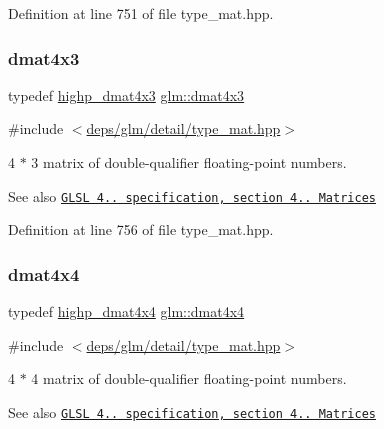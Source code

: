 Definition at line 751 of file type\+\_\+mat.\+hpp.

\mbox{\label{group__core__types_gaa4a157ac183c5bd5dcbd555a94b1b505}} 
\subsubsection{\texorpdfstring{dmat4x3}{dmat4x3}}
{\footnotesize\ttfamily typedef \hyperlink{group__core__precision_ga9a5dab260df6e8c46c747bac0b8d2f38}{highp\+\_\+dmat4x3} \hyperlink{group__core__types_gaa4a157ac183c5bd5dcbd555a94b1b505}{glm\+::dmat4x3}}



{\ttfamily \#include $<$\hyperlink{type__mat_8hpp}{deps/glm/detail/type\+\_\+mat.\+hpp}$>$}

4 $\ast$ 3 matrix of double-\/qualifier floating-\/point numbers.

\begin{DoxySeeAlso}{See also}
\href{http://www.opengl.org/registry/doc/GLSLangSpec.4.20.8.pdf}{\tt G\+L\+SL 4.. specification, section 4.. Matrices} 
\end{DoxySeeAlso}


Definition at line 756 of file type\+\_\+mat.\+hpp.

\mbox{\label{group__core__types_ga54d90d4b902d93638b906571af215bb1}} 
\subsubsection{\texorpdfstring{dmat4x4}{dmat4x4}}
{\footnotesize\ttfamily typedef \hyperlink{group__core__precision_gad3df38df8c4f7ef9b38f03581ff60142}{highp\+\_\+dmat4x4} \hyperlink{group__core__types_ga54d90d4b902d93638b906571af215bb1}{glm\+::dmat4x4}}



{\ttfamily \#include $<$\hyperlink{type__mat_8hpp}{deps/glm/detail/type\+\_\+mat.\+hpp}$>$}

4 $\ast$ 4 matrix of double-\/qualifier floating-\/point numbers.

\begin{DoxySeeAlso}{See also}
\href{http://www.opengl.org/registry/doc/GLSLangSpec.4.20.8.pdf}{\tt G\+L\+SL 4.. specification, section 4.. Matrices} 
\end{DoxySeeAlso}


